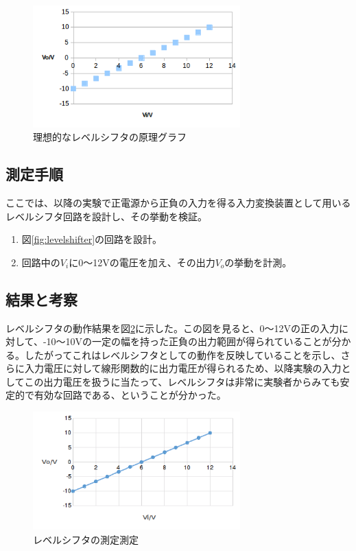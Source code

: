 \documentclass[11pt,a4j]{jsarticle}
\begin{document}
   \begin{figure}[htbp]
  \centering
  \includegraphics[width=8cm,clip]{risou_levelshifter.png}
  \caption{理想的なレベルシフタの原理グラフ}
  \label{fig:risou_levelshifter}
 \end{figure}
   
  \subsection{測定手順}
   ここでは、以降の実験で正電源から正負の入力を得る入力変換装置として用いるレベルシフタ回路を設計し、その挙動を検証。
   \begin{enumerate}
   \item 図\ref{fig:levelshifter}の回路を設計。
   \item 回路中の$V_i$に0～12Vの電圧を加え、その出力$V_o$の挙動を計測。
   \end{enumerate}
   
   
  \subsection{結果と考察} \label{sec:le_kousatu}
  レベルシフタの動作結果を図\ref{fig:1_0}に示した。この図を見ると、0～12Vの正の入力に対して、-10～10Vの一定の幅を持った正負の出力範囲が得られていることが分かる。したがってこれはレベルシフタとしての動作を反映していることを示し、さらに入力電圧に対して線形関数的に出力電圧が得られるため、以降実験の入力としてこの出力電圧を扱うに当たって、レベルシフタは非常に実験者からみても安定的で有効な回路である、ということが分かった。
  
   \begin{figure}[htbp]
  \centering
  \includegraphics[width=8cm,clip]{1_0.png}
  \caption{レベルシフタの測定測定}
  \label{fig:1_0}
 \end{figure}%
   
\end{document}

